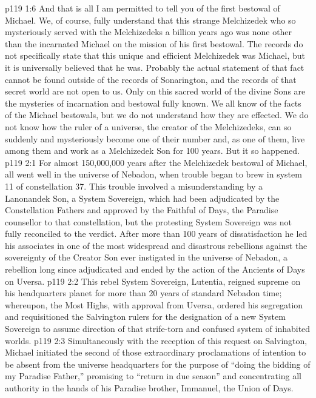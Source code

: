 \vs p119 1:6 And that is all I am permitted to tell you of the first bestowal of Michael. We, of course, fully understand that this strange Melchizedek who so mysteriously served with the Melchizedeks a billion years ago was none other than the incarnated Michael on the mission of his first bestowal. The records do not specifically state that this unique and efficient Melchizedek was Michael, but it is universally believed that he was. Probably the actual statement of that fact cannot be found outside of the records of Sonarington, and the records of that secret world are not open to us. Only on this sacred world of the divine Sons are the mysteries of incarnation and bestowal fully known. We all know of the facts of the Michael bestowals, but we do not understand how they are effected. We do not know how the ruler of a universe, the creator of the Melchizedeks, can so suddenly and mysteriously become one of their number and, as one of them, live among them and work as a Melchizedek Son for 100 years. But it so happened.
\vs p119 2:1 For almost 150,000,000 years after the Melchizedek bestowal of Michael, all went well in the universe of Nebadon, when trouble began to brew in system 11 of constellation 37. This trouble involved a misunderstanding by a Lanonandek Son, a System Sovereign, which had been adjudicated by the Constellation Fathers and approved by the Faithful of Days, the Paradise counsellor to that constellation, but the protesting System Sovereign was not fully reconciled to the verdict. After more than 100 years of dissatisfaction he led his associates in one of the most widespread and disastrous rebellions against the sovereignty of the Creator Son ever instigated in the universe of Nebadon, a rebellion long since adjudicated and ended by the action of the Ancients of Days on Uversa.
\vs p119 2:2 This rebel System Sovereign, Lutentia, reigned supreme on his headquarters planet for more than 20 years of standard Nebadon time; whereupon, the Most Highs, with approval from Uversa, ordered his segregation and requisitioned the Salvington rulers for the designation of a new System Sovereign to assume direction of that strife\hyp{}torn and confused system of inhabited worlds.
\vs p119 2:3 \pc Simultaneously with the reception of this request on Salvington, Michael initiated the second of those extraordinary proclamations of intention to be absent from the universe headquarters for the purpose of “doing the bidding of my Paradise Father,” promising to “return in due season” and concentrating all authority in the hands of his Paradise brother, Immanuel, the Union of Days.
